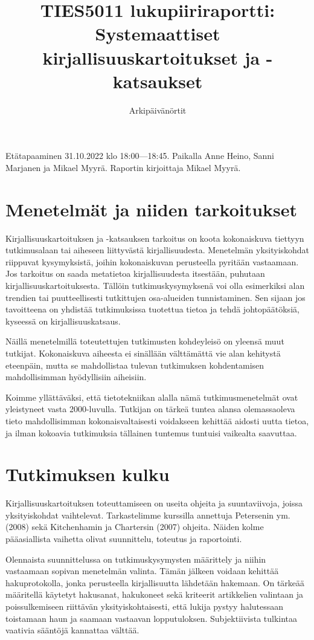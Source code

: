 \documentclass{article}
\title{TIES5011 lukupiiriraportti: Systemaattiset kirjallisuuskartoitukset ja -katsaukset}
\author{Arkipäivänörtit}
\date{}
\begin{document}
\maketitle

Etätapaaminen 31.10.2022 klo 18:00—18:45.
Paikalla Anne Heino, Sanni Marjanen ja Mikael Myyrä.
Raportin kirjoittaja Mikael Myyrä.

\section*{Menetelmät ja niiden tarkoitukset}

Kirjallisuuskartoituksen ja -katsauksen tarkoitus on koota kokonaiskuva
tiettyyn tutkimusalaan tai aiheseen liittyvästä kirjallisuudesta. Menetelmän
yksityiskohdat riippuvat kysymyksistä, joihin kokonaiskuvan perusteella
pyritään vastaamaan. Jos tarkoitus on saada metatietoa kirjallisuudesta
itsestään, puhutaan kirjallisuuskartoituksesta. Tällöin tutkimuskysymyksenä voi
olla esimerkiksi alan trendien tai puutteellisesti tutkittujen osa-alueiden
tunnistaminen. Sen sijaan jos tavoitteena on yhdistää tutkimuksissa tuotettua
tietoa ja tehdä johtopäätöksiä, kyseessä on kirjallisuuskatsaus.

Näillä menetelmillä toteutettujen tutkimusten kohdeyleisö on yleensä muut
tutkijat. Kokonaiskuva aiheesta ei sinällään välttämättä vie alan kehitystä
eteenpäin, mutta se mahdollistaa tulevan tutkimuksen kohdentamisen 
mahdollisimman hyödyllisiin aiheisiin.

Koimme yllättäväksi, että tietotekniikan alalla nämä tutkimusmenetelmät ovat
yleistyneet vasta 2000-luvulla. Tutkijan on tärkeä tuntea alansa olemassaoleva
tieto mahdollisimman kokonaisvaltaisesti voidakseen kehittää aidosti uutta
tietoa, ja ilman kokoavia tutkimuksia tällainen tuntemus tuntuisi vaikealta
saavuttaa.

\section*{Tutkimuksen kulku}

Kirjallisuuskartoituksen toteuttamiseen on useita ohjeita ja suuntaviivoja,
joissa yksityiskohdat vaihtelevat. Tarkastelimme kurssilla annettuja
Petersenin ym. (2008) sekä Kitchenhamin ja Chartersin (2007) ohjeita.
Näiden kolme pääasiallista vaihetta olivat suunnittelu, toteutus ja raportointi.

Olennaista suunnittelussa on tutkimuskysymysten määrittely ja niihin vastaamaan
sopivan menetelmän valinta. Tämän jälkeen voidaan kehittää hakuprotokolla,
jonka perusteella kirjallisuutta lähdetään hakemaan. On tärkeää määritellä
käytetyt hakusanat, hakukoneet sekä kriteerit artikkelien valintaan ja
poissulkemiseen riittävän yksityiskohtaisesti, että lukija pystyy halutessaan
toistamaan haun ja saamaan vastaavan lopputuloksen. Subjektiivista tulkintaa
vaativia sääntöjä kannattaa välttää.
\end{document}
